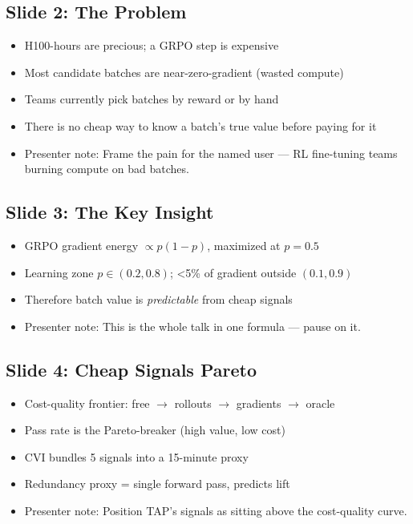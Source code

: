 \documentclass[11pt,letterpaper]{article}
\begin{document}
\subsection*{Slide 2: The Problem}

\begin{itemize}
\item H100-hours are precious; a GRPO step is expensive
\item Most candidate batches are near-zero-gradient (wasted compute)
\item Teams currently pick batches by reward or by hand
\item There is no cheap way to know a batch's true value before paying for it
\item Presenter note: Frame the pain for the named user --- RL fine-tuning teams burning compute on bad batches.
\end{itemize}

\subsection*{Slide 3: The Key Insight}

\begin{itemize}
\item GRPO gradient energy $\propto p(1-p)$, maximized at $p=0.5$
\item Learning zone $p \in (0.2, 0.8)$; <5\% of gradient outside $(0.1, 0.9)$
\item Therefore batch value is \emph{predictable} from cheap signals
\item Presenter note: This is the whole talk in one formula --- pause on it.
\end{itemize}

\subsection*{Slide 4: Cheap Signals Pareto}

\begin{itemize}
\item Cost-quality frontier: free $\rightarrow$ rollouts $\rightarrow$ gradients $\rightarrow$ oracle
\item Pass rate is the Pareto-breaker (high value, low cost)
\item CVI bundles 5 signals into a 15-minute proxy
\item Redundancy proxy = single forward pass, predicts lift
\item Presenter note: Position TAP's signals as sitting above the cost-quality curve.
\end{itemize}
\end{document}
